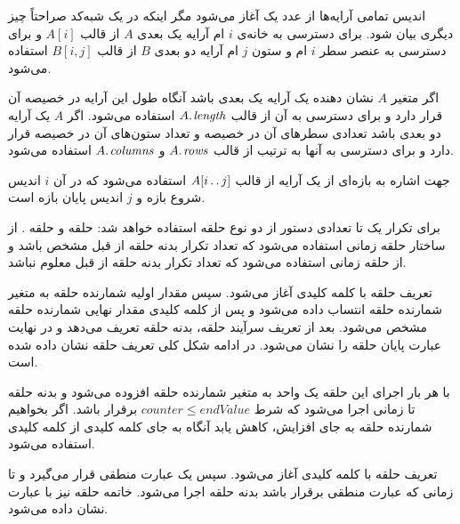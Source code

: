 اندیس تمامی آرایه‌ها از عدد یک آغاز می‌شود مگر اینکه در یک شبه‌کد صراحتاً چیز دیگری بیان شود. برای دسترسی به خانه‌‌ی {$i$} ام آرایه یک بعدی {$A$} از قالب {$A[i]$} و برای دسترسی به عنصر سطر {$i$} ام و ستون {$j$} ام آرایه دو بعدی {$B$} از قالب {$B[i,j]$} استفاده می‌شود. 

اگر متغیر {$A$} نشان دهنده یک آرایه یک بعدی باشد آنگاه طول این آرایه در خصیصه {} آن قرار دارد و برای دسترسی به آن از قالب {$A.\hspace*{1pt}\mathit{length}$} استفاده می‌شود. اگر {$A$} یک آرایه دو بعدی باشد تعدادی سطرهای آن در خصیصه {} و تعداد ستون‌های آن در خصیصه {} قرار دارد و برای دسترسی به آنها به ترتیب از قالب {$A.\hspace*{1pt}\mathit{rows}$} و {$A.\hspace*{1pt}\mathit{columns}$} استفاده می‌شود. 

جهت اشاره به بازه‌ای از یک آرایه از قالب {$A[i\mathinner{\ldotp\ldotp} j]$} استفاده می‌شود که در آن {$i$} اندیس شروع بازه و {$j$} اندیس پایان بازه است.

برای تکرار یک تا تعدادی دستور از دو نوع حلقه استفاده خواهد شد: حلقه {} و حلقه {}. از ساختار حلقه {} زمانی استفاده می‌شود که تعداد تکرار بدنه حلقه از قبل مشخص باشد و از حلقه {} زمانی استفاده می‌شود که تعداد تکرار بدنه حلقه از قبل معلوم نباشد.

تعریف حلقه {} با کلمه کلیدی {} آغاز می‌شود. سپس مقدار اولیه شمارنده حلقه به متغیر شمارنده حلقه انتساب داده می‌شود و پس از کلمه کلیدی {} مقدار نهایی شمارنده حلقه مشخص می‌شود. بعد از تعریف سرآیند حلقه، بدنه حلقه تعریف می‌دهد و در نهایت عبارت {} پایان حلقه را نشان می‌شود. در ادامه شکل کلی تعریف حلقه {} نشان داده شده است.
\begin{latin}
\begin{algorithmic}[1]
	\State	{}
\EndFor
\end{algorithmic}
\end{latin}
با هر بار اجرای این حلقه یک واحد به متغیر شمارنده حلقه افزوده می‌شود و بدنه حلقه تا زمانی اجرا می‌شود که شرط {$\mathit{counter} \leqslant \mathit{endValue}$} برقرار باشد. اگر بخواهیم شمارنده حلقه به جای افزایش، کاهش یابد آنگاه به جای کلمه کلیدی {} از کلمه کلیدی {} استفاده می‌شود.

تعریف حلقه {} با کلمه کلیدی {} آغاز می‌شود. سپس یک عبارت منطقی قرار می‌گیرد و تا زمانی که عبارت منطقی برقرار باشد بدنه حلقه اجرا می‌شود. خاتمه حلقه {} نیز با عبارت {} نشان داده می‌شود.
\begin{latin}
\begin{algorithmic}[1]
	\State	{}
\EndWhile
\end{algorithmic}
\end{latin}

